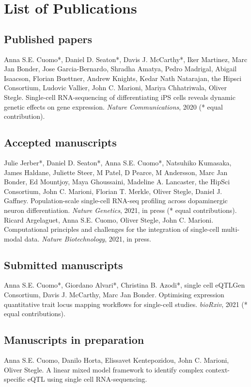 \chapter{List of Publications}

\section{Published papers}

Anna S.E. Cuomo*, Daniel D. Seaton*, Davis J. McCarthy*, Iker Martinez, Marc Jan Bonder, Jose Garcia-Bernardo, Shradha Amatya, Pedro Madrigal, Abigail Isaacson, Florian Buettner, Andrew Knights, Kedar Nath Natarajan, the Hipsci Consortium, Ludovic Vallier, John C. Marioni, Mariya Chhatriwala, Oliver Stegle. 
Single-cell RNA-sequencing of differentiating iPS cells reveals dynamic genetic effects on gene expression. \textit{Nature Communications}, 2020 (* equal contribution).

\section{Accepted manuscripts}

Julie Jerber*, Daniel D. Seaton*, Anna S.E. Cuomo*, Natsuhiko Kumasaka, James Haldane, Juliette Steer, M Patel, D Pearce, M Andersson, Marc Jan Bonder, Ed Mountjoy, Maya Ghoussaini, Madeline A. Lancaster, the HipSci Consortium, John C. Marioni, Florian T. Merkle, Oliver Stegle, Daniel J. Gaffney.
Population-scale single-cell RNA-seq profiling across dopaminergic neuron differentiation. \textit{Nature Genetics}, 2021, in press (* equal contributions). \\

Ricard Argelaguet, Anna S.E. Cuomo, Oliver Stegle, John C. Marioni. 
Computational principles and challenges for the integration of single-cell multi-modal data. \textit{Nature Biotechnology}, 2021, in press. 

\section{Submitted manuscripts}

Anna S.E. Cuomo*, Giordano Alvari*, Christina B. Azodi*, single cell eQTLGen Consortium, Davis J. McCarthy, Marc Jan Bonder.  
Optimising expression quantitative trait locus mapping workflows for single-cell studies. \textit{bioRxiv}, 2021 (* equal contributions). 

\section{Manuscripts in preparation}

Anna S.E. Cuomo, Danilo Horta, Elissavet Kentepozidou, John C. Marioni, Oliver Stegle.
A linear mixed model framework to identify complex context-specific eQTL using single cell RNA-sequencing.

